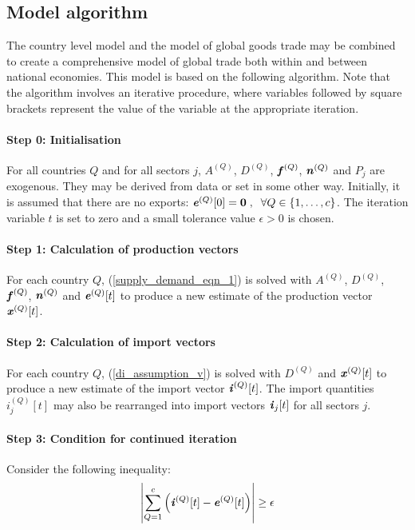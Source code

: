 \documentclass[preprint,authoryear,3p]{elsarticle}
\begin{document}
\subsection{Model algorithm} \label{model_algorithm}

The country level model and the model of global goods trade may be combined to create a comprehensive model of global trade both within and between national economies. This model is based on the following algorithm. Note that the algorithm involves an iterative procedure, where variables followed by square brackets represent the value of the variable at the appropriate iteration.

\paragraph{Step 0: Initialisation} For all countries $Q$ and for all sectors $j$, $A^{(Q)}$, $D^{(Q)}$, $\textbf{\textit{f}}^{(Q)}$, $\textbf{\textit{n}}^{(Q)}$ and $P_j$ are exogenous. They may be derived from data or set in some other way. Initially, it is assumed that there are no exports: $\textbf{\textit{e}}^{(Q)}[0] = \mathbf{0} \; , \; \; \forall Q \in \{1, \mathellipsis , c \}$. The iteration variable $t$ is set to zero and a small tolerance value $\epsilon > 0$ is chosen.

\paragraph{Step 1: Calculation of production vectors} For each country $Q$, (\ref{supply_demand_eqn_1}) is solved with $A^{(Q)}$, $D^{(Q)}$, $\textbf{\textit{f}}^{(Q)}$, $\textbf{\textit{n}}^{(Q)}$ and $\textbf{\textit{e}}^{(Q)}[t]$ to produce a new estimate of the production vector $\textbf{\textit{x}}^{(Q)}[t]$.

\paragraph{Step 2: Calculation of import vectors} For each country $Q$, (\ref{di_assumption_v}) is solved with $D^{(Q)}$ and $\textbf{\textit{x}}^{(Q)}[t]$ to produce a new estimate of the import vector $\textbf{\textit{i}}^{(Q)}[t]$. The import quantities $i^{(Q)}_j[t]$ may also be rearranged into import vectors $\textbf{\textit{i}}_j[t]$ for all sectors $j$.

\paragraph{Step 3: Condition for continued iteration} Consider the following inequality:
\begin{align} \label{tolerance_equation}
\left| \sum_{Q=1}^{c} \left(\textbf{\textit{i}}^{(Q)}[t] - \textbf{\textit{e}}^{(Q)}[t] \right) \right| \geq \epsilon
\end{align}
\end{document}

